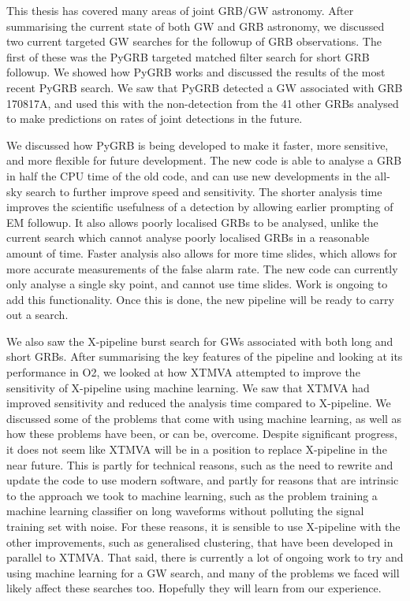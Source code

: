 \documentclass[11pt]{cuthesis}
\newcommand{\xp}{X-pipeline }
\begin{document}
This thesis has covered many areas of joint GRB/GW astronomy. After summarising the current state of both GW and GRB astronomy, we discussed two current targeted GW searches for the followup of GRB observations. The first of these was the PyGRB targeted matched filter search for short GRB followup. We showed how PyGRB works and discussed the results of the most recent PyGRB search. We saw that PyGRB detected a GW associated with GRB 170817A, and used this with the non-detection from the 41 other GRBs analysed to make predictions on rates of joint detections in the future. 

We discussed how PyGRB is being developed to make it faster, more sensitive, and more flexible for future development. The new code is able to analyse a GRB in half the CPU time of the old code, and can use new developments in the all-sky search to further improve speed and sensitivity. The shorter analysis time improves the scientific usefulness of a detection by allowing earlier prompting of EM followup. It also allows poorly localised GRBs to be analysed, unlike the current search which cannot analyse poorly localised GRBs in a reasonable amount of time. Faster analysis also allows for more time slides, which allows for more accurate measurements of the false alarm rate. The new code can currently only analyse a single sky point, and cannot use time slides. Work is ongoing to add this functionality. Once this is done, the new pipeline will be ready to carry out a search. 

We also saw the \xp burst search for GWs associated with both long and short GRBs. After summarising the key features of the pipeline and looking at its performance in O2, we looked at how XTMVA attempted to improve the sensitivity of \xp using machine learning. We saw that XTMVA had improved sensitivity and reduced the analysis time compared to X-pipeline. We discussed some of the problems that come with using machine learning, as well as how these problems have been, or can be, overcome. Despite significant progress, it does not seem like XTMVA will be in a position to replace \xp in the near future. This is partly for technical reasons, such as the need to rewrite and update the code to use modern software, and partly for reasons that are intrinsic to the approach we took to machine learning, such as the problem training a machine learning classifier on long waveforms without polluting the signal training set with noise. For these reasons, it is sensible to use \xp with the other improvements, such as generalised clustering, that have been developed in parallel to XTMVA. That said, there is currently a lot of ongoing work to try and using machine learning for a GW search, and many of the problems we faced will likely affect these searches too. Hopefully they will learn from our experience.
\end{document}
